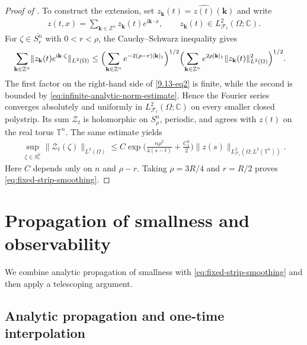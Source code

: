 \documentclass[print,wide]{draft}
\begin{document}
\begin{proof}[Proof of ]
To construct the extension, set \(z_{\mathbf k}(t)=\widehat{z(t)}(\mathbf k)\) and write
\begin{align*}
z(t,x)=\sum_{\mathbf k\in\mathbb Z^n}z_{\mathbf k}(t)e^{\mathrm{i} \mathbf k\cdot x},
\qquad z_{\mathbf k}(t)\in L^2_{\mathcal{F}_t}(\Omega;\mathbb C).
\end{align*}
For \(\zeta\in\overline{S_r^n}\) with \(0<r<\rho\), the Cauchy--Schwarz inequality gives
\begin{align}\label{9.13-eq2}
\sum_{\mathbf k\in\mathbb Z^n}
\lVert z_{\mathbf k}(t)e^{\mathrm{i} \mathbf k\cdot \zeta}\rVert_{L^2(\Omega)}
&\leq
\Bigl(\sum_{\mathbf k\in\mathbb Z^n}e^{-2(\rho-r)|\mathbf k|_1}\Bigr)^{1/2}
\Bigl(\sum_{\mathbf k\in\mathbb Z^n}e^{2\rho|\mathbf k|_1}
\lVert z_{\mathbf k}(t)\rVert_{L^2(\Omega)}^2\Bigr)^{1/2}.
\end{align}
The first factor on the right-hand side of \eqref{9.13-eq2} is finite,
while the second is bounded by \eqref{eq:infinite-analytic-norm-estimate}. Hence the Fourier series
converges absolutely and uniformly in \(L^2_{\mathcal{F}_t}(\Omega;\mathbb C)\)
on every smaller closed polystrip. Its sum \(\mathscr Z_t\) is holomorphic on \(S_\rho^n\),
periodic, and agrees with \(z(t)\) on the real torus $\mathbb T^n$. The same estimate yields
\begin{align}\label{eq:general-strip-bound}
\sup_{\zeta\in\overline{S_r^n}}
\lVert \mathscr Z_t(\zeta)\rVert_{L^2(\Omega)}
\leq
C
\exp\biggl(\frac{n\rho^2}{4(s-t)}+\frac{C_1^2}{2}\biggr)
\lVert z(s)\rVert_{L^2_{\mathcal{F}_s}(\Omega;L^2(\mathbb T^n))}.
\end{align}
Here \(C\) depends only on \(n\) and \(\rho-r\).
Taking \(\rho=3R/4\) and \(r=R/2\) proves \eqref{eq:fixed-strip-smoothing}.
\end{proof}



\section{Propagation of smallness and observability}\label{sec:propagation}

We combine analytic propagation of smallness with
\eqref{eq:fixed-strip-smoothing} and then apply a telescoping argument.

\subsection{Analytic propagation and one-time interpolation}
\end{document}
